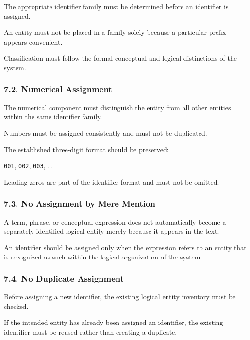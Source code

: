 The appropriate identifier family
must be determined before an identifier
is assigned.

An entity must not be placed in a
family solely because a particular
prefix appears convenient.

Classification must follow the
formal conceptual and logical
distinctions of the system.

\subsubsection*{7.2. Numerical Assignment}

The numerical component must
distinguish the entity from all
other entities within the same
identifier family.

Numbers must be assigned consistently
and must not be duplicated.

The established three-digit format
should be preserved:

\begin{center}
    \texttt{001}, \texttt{002},
    \texttt{003}, \ldots
\end{center}

Leading zeros are part of the
identifier format and must not
be omitted.

\subsubsection*{7.3. No Assignment by Mere Mention}

A term, phrase, or conceptual expression
does not automatically become a
separately identified logical entity
merely because it appears in the text.

An identifier should be assigned
only when the expression refers
to an entity that is recognized
as such within the logical
organization of the system.

\subsubsection*{7.4. No Duplicate Assignment}

Before assigning a new identifier,
the existing logical entity inventory
must be checked.

If the intended entity has already
been assigned an identifier, the
existing identifier must be reused
rather than creating a duplicate.


